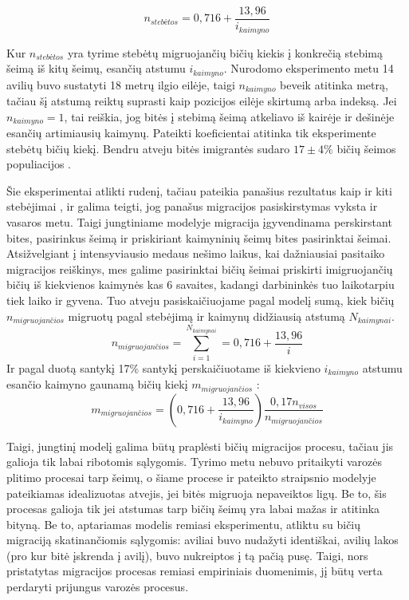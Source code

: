 \documentclass{VUMIFKompMagistrinis}
\begin{document}
\begin{equation}
    n_{steb\textit{\.{e}}tos} = 0,716 + \frac{13,96}{i_{kaimyno}}
\end{equation}



Kur $n_{steb\textit{\.{e}}tos}$ yra tyrime stebėtų migruojančių bičių kiekis į konkrečią stebimą šeimą iš kitų šeimų, esančių atstumu $i_{kaimyno}$. Nurodomo eksperimento metu 14 avilių buvo sustatyti 18 metrų ilgio eilėje, taigi $n_{kaimyno}$ beveik atitinka metrą, tačiau šį atstumą reiktų suprasti kaip pozicijos eilėje skirtumą arba indeksą. Jei $n_{kaimyno}=1$, tai reiškia, jog bitės į stebimą šeimą atkeliavo iš kairėje ir dešinėje esančių artimiausių kaimynų. Pateikti koeficientai atitinka tik eksperimente stebėtų bičių kiekį. Bendru atveju bitės imigrantės sudaro $17 ± 4\%$ bičių šeimos populiacijos \cite{BPC16}. 

Šie eksperimentai atlikti rudenį, tačiau pateikia panašius rezultatus kaip ir kiti stebėjimai \cite{PfC98, BPC16}, ir galima teigti, jog panašus migracijos pasiskirstymas vyksta ir vasaros metu. Taigi jungtiniame modelyje migracija įgyvendinama perskirstant bites, pasirinkus šeimą ir priskiriant kaimyninių šeimų bites pasirinktai šeimai. Atsižvelgiant į intensyviausio medaus nešimo laikus, kai dažniausiai pasitaiko migracijos reiškinys, mes galime pasirinktai bičių šeimai priskirti  imigruojančių bičių iš kiekvienos kaimynės kas 6 savaites, kadangi darbininkės tuo laikotarpiu tiek laiko ir gyvena. Tuo atveju pasiskaičiuojame pagal modelį sumą, kiek bičių $ n_{migruojan\textit{\v{c}}ios}$ migruotų pagal stebėjimą ir kaimynų didžiausią atstumą ${N_{kaimynai}}$.
\begin{equation}
    n_{migruojan\textit{\v{c}}ios} = \sum_{i=1}^{N_{kaimynai}} = 0,716 + \frac{13,96}{i}
\end{equation}
    Ir pagal duotą santykį 17\% santykį perskaičiuotame iš kiekvieno  $i_{kaimyno}$ atstumu esančio kaimyno gaunamą bičių kiekį $m_{migruojan\textit{\v{c}}ios}$ :
\begin{equation}   
    m_{migruojan\textit{\v{c}}ios} = (0,716 + \frac{13,96}{i_{kaimyno}}) \frac {0,17n_{visos}}{n_{migruojan\textit{\v{c}}ios}}
\end{equation}

Taigi, jungtinį modelį galima būtų praplėsti bičių migracijos procesu, tačiau jis galioja tik labai ribotomis sąlygomis. Tyrimo metu nebuvo pritaikyti varozės plitimo procesai tarp šeimų, o šiame procese ir pateikto straipsnio \cite{BPC16} modelyje pateikiamas idealizuotas atvejis, jei bitės migruoja nepaveiktos ligų. Be to, šis procesas galioja tik jei atstumas tarp bičių šeimų yra labai mažas ir atitinka bityną. Be to, aptariamas modelis remiasi eksperimentu, atliktu su bičių migraciją skatinančiomis sąlygomis: aviliai buvo nudažyti identiškai, avilių lakos (pro kur bitė įskrenda į avilį), buvo nukreiptos į tą pačią pusę. Taigi, nors pristatytas migracijos procesas remiasi empiriniais duomenimis, jį būtų verta perdaryti prijungus varozės procesus.
\end{document}
